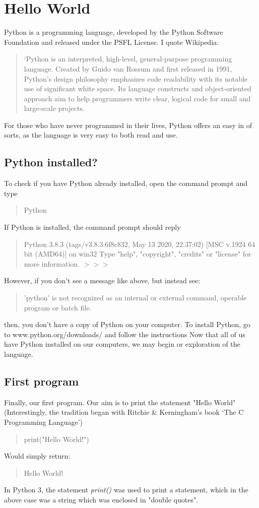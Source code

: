 \chapter{Hello World}
Python is a programming language, developed by the Python Software Foundation and released under the PSFL License. I quote Wikipedia:
\begin{quotation}
`Python is an interpreted, high-level, general-purpose programming language. Created by Guido van Rossum and first released in 1991, Python's design philosophy emphasizes code readability with its notable use of significant white space. Its language constructs and object-oriented approach aim to help programmers write clear, logical code for small and large-scale projects.
\end{quotation}
For those who have never programmed in their lives, Python offers an easy in of sorts, as the language is very easy to both read and use.
\section{Python installed?}
To check if you have Python already installed, open the command prompt and type \begin{quote}
Python
\end{quote}
If Python is installed, the command prompt should reply
\begin{quote}
Python 3.8.3 (tags/v3.8.3:6f8c832, May 13 2020, 22:37:02) [MSC v.1924 64 bit (AMD64)] on win32\newline 
Type "help", "copyright", "credits" or "license" for more information.\newline 
$>>>$
\end{quote}
However, if you don't see a message like above, but instead see:
\begin{quote}
'python' is not recognized as an internal or external command,\newline 
operable program or batch file.
\end{quote}
then, you don't have a copy of Python on your computer.
To install Python, go to www.python.org/downloads/ and follow the instructions\newline 
Now that all of us have Python installed on our computers, we may begin or exploration of the language.
\section{First program}
Finally, our first program. Our aim is to print the statement "Hello World" (Interestingly, the tradition began with Ritchie \& Kerningham's book `The C Programming Language')\begin{quote}
print("Hello World!")
\end{quote}
Would simply return:
\begin{quote}
Hello World!
\end{quote}
In Python 3, the statement \emph{print()} was used to print a statement, which in the above case was a string which was enclosed in "double quotes". 
